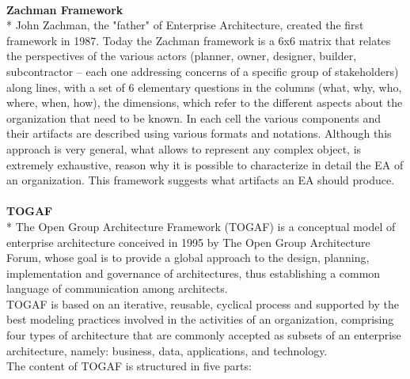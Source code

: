 \documentclass[runningheads]{llncs}
\begin{document}
\\
\textbf{Zachman Framework}
\\*
John Zachman, the "father" of Enterprise Architecture, created the first framework in 1987. Today the Zachman framework is a 6x6 matrix that relates the perspectives of the various actors (planner, owner, designer, builder, subcontractor – each one addressing concerns of a specific group of stakeholders) along lines, with a set of 6 elementary questions in the columns (what, why, who, where, when, how), the dimensions, which refer to the different aspects about the organization that need to be known.
In each cell the various components and their artifacts are described using various formats and notations.
Although this approach is very general, what allows to represent any complex object, is extremely exhaustive, reason why it is possible to characterize in detail the EA of an organization. This framework suggests what artifacts an EA should produce.\\
\\
\textbf{TOGAF}
\\*
The Open Group Architecture Framework (TOGAF) is a conceptual model of enterprise architecture conceived in 1995 by The Open Group Architecture Forum, whose goal is to provide a global approach to the design, planning, implementation and governance of architectures, thus establishing a common language of communication among architects.\\
TOGAF is based on an iterative, reusable, cyclical process and supported by the best modeling practices involved in the activities of an organization, comprising four types of architecture that are commonly accepted as subsets of an enterprise architecture, namely: business, data, applications, and technology.\\
The content of TOGAF is structured in five parts:~\cite{ref_book1}
\end{document}
